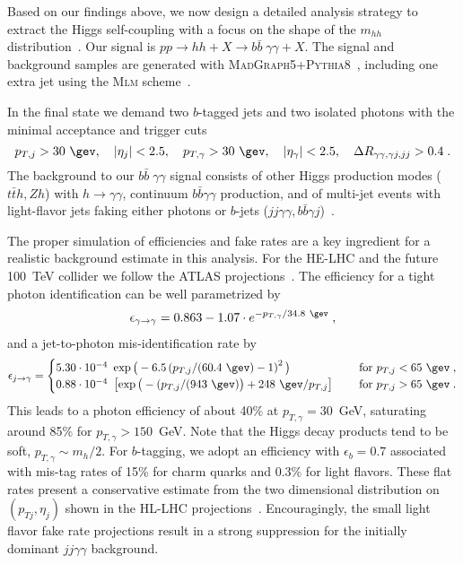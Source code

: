 Based on our findings above, we now design a detailed analysis strategy to extract the Higgs
self-coupling with a focus on the shape of the $m_{hh}$
distribution~\cite{Goncalves:2018yva}. Our signal is $pp \to hh + X \to b\bar{b} \; \gamma \gamma + X$.
The signal and background samples are generated with
\textsc{MadGraph5}+\textsc{Pythia8}~\cite{Alwall:2011uj, Alwall:2014hca,Sjostrand:2007gs}, including one
extra jet using the \textsc{Mlm} scheme~\cite{Mangano2002}.\medskip

In the final state we demand two $b$-tagged jets and
two isolated photons with the minimal acceptance and trigger cuts
%
\begin{equation}
p_{T,j}>30~\gev , \quad  
|\eta_j |<2.5, \quad 
p_{T,\gamma}>30~\gev, \quad  
|\eta_\gamma| <2.5 , \quad 
\Delta R_{\gamma \gamma, \gamma j, jj} >0.4 \; .
\label{eq:base_selections}
\end{equation}
%
The background to our $b\bar{b} \; \gamma \gamma$ signal consists of
other Higgs production modes ($t\bar{t}h, Zh$) with $h \to \gamma
\gamma$, continuum $b\bar{b}\gamma\gamma$ production, and of multi-jet
events with light-flavor jets faking either photons or $b$-jets
($jj\gamma\gamma, b\bar{b}\gamma j$)~\cite{Baur:2003gp}.  

The proper simulation of efficiencies and fake rates are a key
ingredient for a realistic background estimate in this analysis.  For
the HE-LHC and the future 100~TeV collider we follow the ATLAS
projections~\cite{ATL-PHYS-PUB-2016-026}. The efficiency for a tight photon 
identification can be well parametrized by
%
\begin{align}
\epsilon_{\gamma\to\gamma} = 0.863 - 1.07 \cdot e^{-p_{T,\gamma}/34.8~\gev}\;,
\end{align}
%
and a jet-to-photon mis-identification rate by
\begin{align}
\epsilon_{j\to\gamma} = 
\begin{cases} 
5.30\cdot 10^{-4}  \ \exp\big( -6.5 \left( p_{T,j}/(60.4~\gev)- 1 \right)^2 \big) 
\quad &\text{ for } p_{T,j} <65~\gev \;, \\
0.88 \cdot 10^{-4} \  \left[ \exp \big( -(p_{T,j}/(943~\gev) \big) +248~\gev/p_{T,j}\right]
\quad &\text{ for } p_{T,j} >65~\gev \;.
\end{cases}
\end{align}
%
This leads to a photon efficiency of about 40\% at $p_{T,\gamma}=30$~GeV,
saturating around 85\% for $p_{T,\gamma}>150$~GeV. Note that the 
Higgs decay products tend to be soft, $p_{T,\gamma}\sim m_h/2$. 
For $b$-tagging, we adopt an efficiency with $\epsilon_b =0.7$ associated 
with mis-tag rates of 15\% for charm quarks and 0.3\% for
light flavors. These flat rates present a conservative estimate from
the two dimensional distribution on $(p_{Tj},\eta_j)$ shown in the
HL-LHC projections~\cite{Kling:2016lay}. Encouragingly, the small light
flavor fake rate projections result in a strong suppression for the
initially dominant $jj\gamma\gamma$ background.

